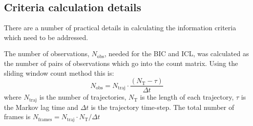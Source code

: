 \subsection{Criteria calculation details}\label{sec:hmm_details}
There are a number of practical details in calculating the information criteria which need to be addressed. 

The number of observations, $N_{\mathrm{obs}}$, needed for the BIC and ICL, was calculated as the number of pairs of observations which go into the count matrix. Using the sliding window count method this is:
\begin{equation}
    N_{\mathrm{obs}} = N_{\mathrm{traj}}\cdot\frac{(N_{\mathrm{T}} - \tau)}{\Delta t}
\end{equation}
where $N_{\mathrm{traj}}$ is the number of trajectories, $N_{\mathrm{T}}$ is the length of each trajectory, $\tau$ is the Markov lag time and  $\Delta t$ is the trajectory time-step. The total number of frames is $N_{\mathrm{frames}} = N_{\mathrm{traj}}\cdot N_{\mathrm{T}} /\Delta t$

